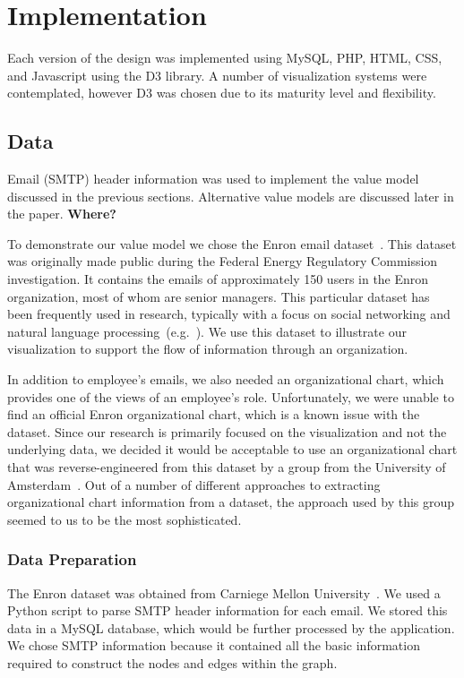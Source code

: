 \documentclass[journal]{vgtc}                %
\begin{document}
\section{Implementation}
\label{sec:implementation}
Each version of the design was implemented using MySQL, PHP, HTML, CSS, and Javascript using the D3 library.  A number of visualization systems were contemplated, however D3 was chosen due to its maturity level and flexibility.

\subsection{Data}
Email (SMTP) header information was used to implement the value model discussed in the previous sections.  Alternative value models are discussed later in the paper. \textbf{{\color{Plum}Where?}}

To demonstrate our value model we chose the Enron email dataset~\cite{cmuenron,klimt2004introducing}. This dataset was originally made public during the Federal Energy Regulatory Commission investigation.  It contains the emails of approximately 150 users in the Enron organization, most of whom are senior managers.  This particular dataset has been frequently used in research, typically with a focus on social networking and natural language processing~(e.g.~\cite{diesner2005exploration}). We use this dataset to illustrate our visualization to support the flow of information through an organization.  

In addition to employee's emails, we also needed an organizational chart, which provides one of the views of an employee's role.  Unfortunately, we were unable to find an official Enron organizational chart, which is a known issue with the dataset.  Since our research is primarily focused on the visualization and not the underlying data, we decided it would be acceptable to use an organizational chart that was reverse-engineered from this dataset by a group from the University of Amsterdam~\cite{rowe2007automated}. Out of a number of different approaches to extracting organizational chart information from a dataset, the approach used by this group seemed to us to be the most sophisticated.

\subsubsection{Data Preparation}

The Enron dataset was obtained from Carniege Mellon University~\cite{cmuenron}.  We used a Python script to parse SMTP header information for each email.  We stored this data in a MySQL database, which would be further processed by the application. We chose SMTP information because it contained all the basic information required to construct the nodes and edges within the graph.
\end{document}
